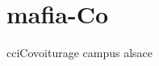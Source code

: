 \chapter{mafia-\/\+Co}
\hypertarget{md__r_e_a_d_m_e}{}\label{md__r_e_a_d_m_e}
\label{md__r_e_a_d_m_e_autotoc_md0}%
%
 cci\+Covoiturage campus alsace 
